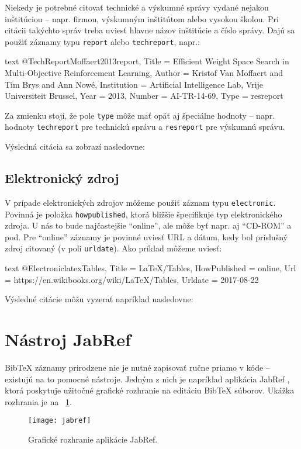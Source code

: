 Niekedy je potrebné citovať technické a výskumné správy vydané nejakou inštitúciou -- napr. firmou, výskumným inštitútom alebo vysokou školou. Pri citácii takýchto správ treba uviesť hlavne názov inštitúcie a číslo správy. Dajú sa použiť záznamy typu \texttt{report} alebo \texttt{techreport}, napr.:
\begin{inlinecode}{text}
@TechReport{Moffaert2013report,
  Title                    = {Efficient Weight Space Search in Multi-Objective Reinforcement Learning},
  Author                   = {Kristof Van Moffaert and Tim Brys and Ann Now{\'e}},
  Institution              = {Artificial Intelligence Lab, Vrije Universiteit Brussel},
  Year                     = {2013},
  Number                   = {AI-TR-14-69},
  Type                     = {resreport}
}
\end{inlinecode}
Za zmienku stojí, že pole \texttt{type} môže mať opäť aj špeciálne hodnoty -- napr. hodnoty \texttt{techreport} pre technickú správu a \texttt{resreport} pre výskumnú správu.

Výsledná citácia sa zobrazí nasledovne:

\noindent[X] 

\subsection{Elektronický zdroj}

V prípade elektronických zdrojov môžeme použiť záznam typu \texttt{electronic}. Povinná je položka \texttt{howpublished}, ktorá bližšie špecifikuje typ elektronického zdroja. U nás to bude najčastejšie \enquote{online}, ale môže byť napr. aj \enquote{CD-ROM} a pod. Pre \enquote{online} záznamy je povinné uviesť URL a dátum, kedy bol príslušný zdroj citovaný (v poli \texttt{urldate}). Ako príklad môžeme uviesť:
\begin{inlinecode}{text}
@Electronic{latexTables,
  Title                    = {LaTeX/Tables},
  HowPublished             = {online},
  Url                      = {https://en.wikibooks.org/wiki/LaTeX/Tables},
  Urldate                  = {2017-08-22}
}
\end{inlinecode}

Výsledné citácie môžu vyzerať napríklad nasledovne:

\noindent[X] 

\noindent[X] 

\section{Nástroj JabRef}

BibTeX záznamy prirodzene nie je nutné zapisovať ručne priamo v kóde -- existujú na to pomocné nástroje. Jedným z nich je napríklad aplikácia JabRef \cite{jabref}, ktorá poskytuje užitočné grafické rozhranie na editáciu BibTeX súborov. Ukážka rozhrania je na \figurename~\ref{fig:jabref}.

\begin{figure}
\centering
\texttt{[image: jabref]}
\caption{Grafické rozhranie aplikácie JabRef.}
\label{fig:jabref}
\end{figure}
